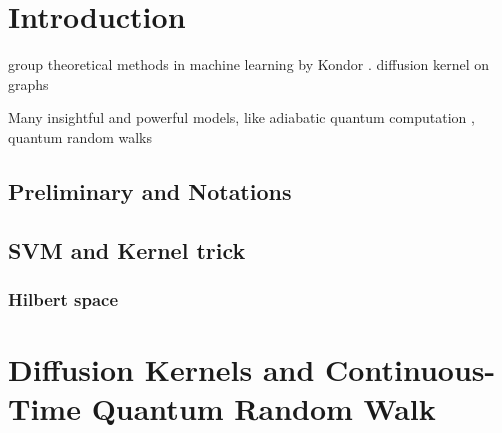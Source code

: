 
\section{Introduction}

group theoretical methods in machine learning by Kondor \cite{kondorGroupTheoreticalMethods2008}.
diffusion kernel on graphs \cite{kondorDiffusionKernelsGraphs2002}

Many insightful and powerful models, like adiabatic quantum computation \cite{farhiQuantumComputationAdiabatic2000}, quantum random walks \cite{childsQuantumInformationProcessing2004} 

\subsection{Preliminary and Notations}
\subsection{SVM and Kernel trick}
\subsubsection*{Hilbert space}

\section{Diffusion Kernels and Continuous-Time Quantum Random Walk}

